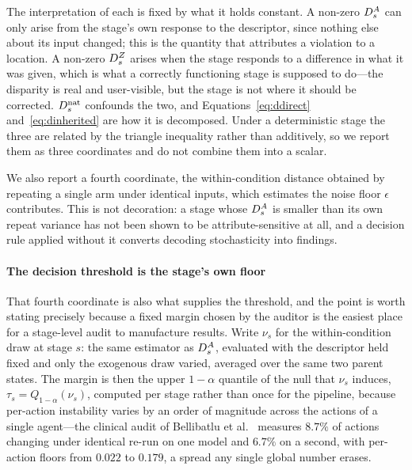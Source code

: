 The interpretation of each is fixed by what it holds constant. A non-zero $D^{A}_s$ can only arise
from the stage's own response to the descriptor, since nothing else about its input changed; this
is the quantity that attributes a violation to a location. A non-zero $D^{Z}_s$ arises when the
stage responds to a difference in what it was given, which is what a correctly functioning stage
is supposed to do---the disparity is real and user-visible, but the stage is not where it should be
corrected. $D^{\mathrm{nat}}_s$ confounds the two, and Equations~\eqref{eq:ddirect}
and~\eqref{eq:dinherited} are how it is decomposed. Under a deterministic stage the three are
related by the triangle inequality rather than additively, so we report them as three coordinates
and do not combine them into a scalar.

We also report a fourth coordinate, the within-condition distance obtained by repeating a single
arm under identical inputs, which estimates the noise floor $\epsilon$ contributes. This is not
decoration: a stage whose $D^{A}_s$ is smaller than its own repeat variance has not been shown to be
attribute-sensitive at all, and a decision rule applied without it converts decoding
stochasticity into findings.

\paragraph{The decision threshold is the stage's own floor}
That fourth coordinate is also what supplies the threshold, and the point is worth stating
precisely because a fixed margin chosen by the auditor is the easiest place for a stage-level
audit to manufacture results. Write $\nu_s$ for the within-condition draw at stage $s$: the same
estimator as $D^{A}_s$, evaluated with the descriptor held fixed and only the exogenous draw
varied, averaged over the same two parent states. The margin is then the upper $1-\alpha$
quantile of the null that $\nu_s$ induces, $\tau_s = Q_{1-\alpha}(\nu_s)$, computed per stage
rather than once for the pipeline, because per-action instability varies by an order of magnitude
across the actions of a single agent---the clinical audit of Bellibatlu et al.~\cite{instabilityfloor} measures
$8.7\%$ of actions changing under identical re-run on one model and $6.7\%$ on a second, with
per-action floors from $0.022$ to $0.179$, a spread any single global number erases.

